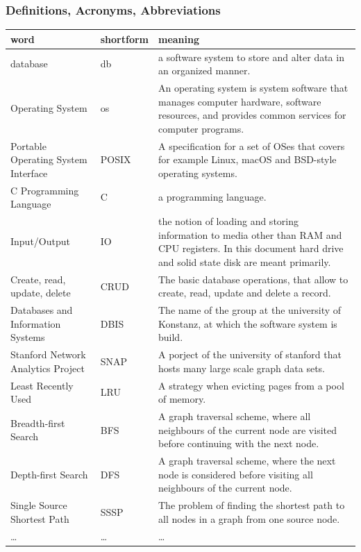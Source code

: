         \subsubsection{Definitions, Acronyms, Abbreviations}
        \begin{longtable}{|>{\raggedright \arraybackslash}p{}||
        >{\raggedright \arraybackslash}p{}|>{\raggedright \arraybackslash}p{}|} \hline

        word & shortform & meaning \\ \hline
        database & db & a software system to store and alter data in an organized manner. \\ \hline
        Operating System & os & An operating system is system software that manages computer hardware, software resources, and provides common services for computer programs. \\ \hline
        Portable Operating System Interface & POSIX & A specification for a set of OSes that covers for example Linux, macOS and BSD-style operating systems. \\ \hline
        C Programming Language & C & a programming language. \\ \hline
        Input/Output & IO & the notion of loading and storing information to media other than RAM and CPU registers. In this document hard drive and solid state disk are meant primarily. \\ \hline
        Create, read, update, delete & CRUD & The basic database operations, that allow to create, read, update and delete a record. \\ \hline
        Databases and Information Systems & DBIS & The name of the group at the university of Konstanz, at which the software system is build. \\ \hline
        Stanford Network Analytics Project & SNAP & A porject of the university of stanford that hosts many large scale graph data sets.  \\ \hline
        Least Recently Used & LRU & A strategy when evicting pages from a pool of memory. \\ \hline
        Breadth-first Search & BFS & A graph traversal scheme, where all neighbours of the current node are visited before continuing with the next node. \\ \hline
        Depth-first Search & DFS & A graph traversal scheme, where the next node is considered before visiting all neighbours of the current node. \\ \hline
        Single Source Shortest Path & SSSP & The problem of finding the shortest path to all nodes in a graph from one source node. \\ \hline
        \dots & \dots & \dots \\ \hline
        \hline
        \end{longtable}
	
